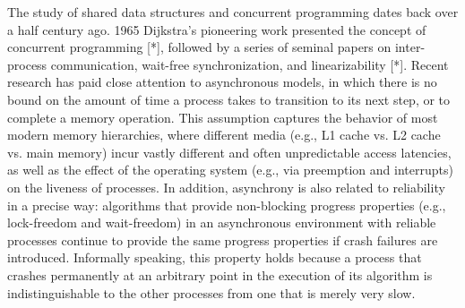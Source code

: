 \documentclass{article}
\begin{document}
The study of shared data structures and concurrent programming dates back over a half century ago. 1965 Dijkstra's pioneering work presented the concept of concurrent programming [*], followed by a series of seminal papers on inter-process communication, wait-free synchronization, and linearizability [*].
Recent research has paid close attention to asynchronous models, in which there is no bound on the amount of time a process takes to transition to its next step, or to complete a memory operation. This assumption captures the behavior of most modern memory hierarchies, where different media (e.g., L1 cache vs. L2 cache vs. main memory) incur vastly different and often unpredictable access latencies, as well as the effect of the operating system (e.g., via preemption and interrupts) on the liveness of processes. In addition, asynchrony is also related to reliability in a precise way: algorithms that provide non-blocking progress properties (e.g., lock-freedom and wait-freedom) in an asynchronous environment with reliable processes continue to provide the same progress properties if crash failures are introduced. Informally speaking, this property holds because a process that crashes permanently at an arbitrary point in the execution of its algorithm is indistinguishable to the other processes from one that is merely very slow.




\end{document}
